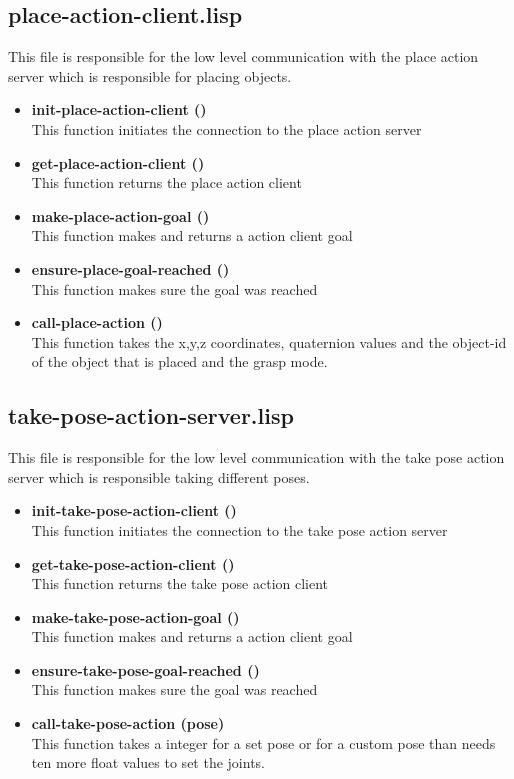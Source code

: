 \documentclass[main.tex]{subfiles}
\begin{document}
		\subsection{place-action-client.lisp}
		This file is responsible for the low level communication with the
		place action server which is responsible for placing objects.
	    \begin{itemize}
			\item \textbf{init-place-action-client ()} \\
			This function initiates the connection to the place action server
			\item \textbf{get-place-action-client ()} \\
			This function returns the place action client
			\item \textbf{make-place-action-goal ()} \\
			This function makes and returns a action client goal
			\item \textbf{ensure-place-goal-reached ()} \\
            This function makes sure the goal was reached
			\item \textbf{call-place-action ()} \\
			This function takes the x,y,z coordinates, quaternion values  and the object-id of the object that is placed and the grasp mode.
		\end{itemize}
		\subsection{take-pose-action-server.lisp}
		This file is responsible for the low level communication with the
		take pose action server which is responsible taking different poses.
		\begin{itemize}
			\item \textbf{init-take-pose-action-client ()} \\
			This function initiates the connection to the take pose action server
			\item \textbf{get-take-pose-action-client ()} \\
			This function returns the take pose action client
			\item \textbf{make-take-pose-action-goal ()} \\
			This function makes and returns a action client goal
			\item \textbf{ensure-take-pose-goal-reached ()} \\
            This function makes sure the goal was reached
			\item \textbf{call-take-pose-action (pose)} \\
			This function takes a integer for a set pose or for a custom pose than needs ten more float values to set the joints.
		\end{itemize}
\end{document}

